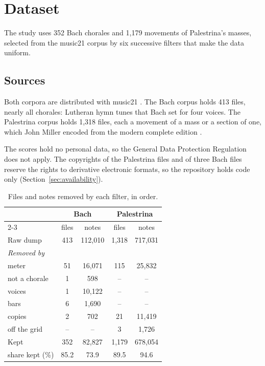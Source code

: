 \section{Dataset}
\label{sec:dataset}
The study uses 352 Bach chorales and 1,179 movements of Palestrina's masses, selected from the music21 corpus \cite{cuthbert2010} by six successive filters that make the data uniform.
\subsection{Sources}

Both corpora are distributed with music21 \cite{cuthbert2010, cuthbert2026music21}. The Bach corpus holds 413 files, nearly all chorales: Lutheran hymn tunes that Bach set for four voices. The Palestrina corpus holds 1,318 files, each a movement of a mass or a section of one, which John Miller encoded from the modern complete edition \cite{palestrina1939}.

The scores hold no personal data, so the General Data Protection Regulation does not apply. The copyrights of the Palestrina files and of three Bach files reserve the rights to derivative electronic formats, so the repository holds code only (Section~\ref{sec:availability}).

\begin{table}[t]
\renewcommand{\arraystretch}{1.3}
\centering
\caption{Files and notes removed by each filter, in order.}
\label{tab:filters}
\begin{tabular}{@{}lcccc@{}}
\hline
& \multicolumn{2}{c}{Bach} & \multicolumn{2}{c}{Palestrina} \\
\cline{2-3} \cline{4-5}
& files & notes & files & notes \\
\hline
Raw dump & 413 & 112,010 & 1,318 & 717,031 \\
\emph{Removed by} & & & & \\
\quad meter & 51 & 16,071 & 115 & 25,832 \\
\quad not a chorale & 1 & 598 & -- & -- \\
\quad voices & 1 & 10,122 & -- & -- \\
\quad bars & 6 & 1,690 & -- & -- \\
\quad copies & 2 & 702 & 21 & 11,419 \\
\quad off the grid & -- & -- & 3 & 1,726 \\
\hline
Kept & 352 & 82,827 & 1,179 & 678,054 \\
\quad share kept (\%) & 85.2 & 73.9 & 89.5 & 94.6 \\
\hline
\end{tabular}
\end{table}

